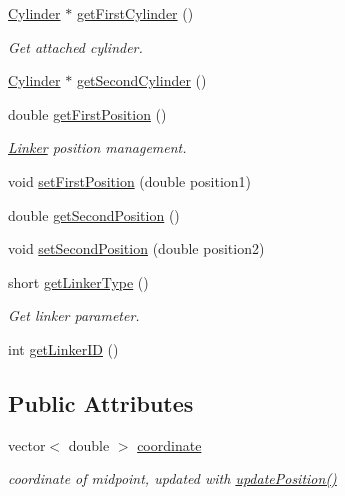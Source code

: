 {\bf }\par
\begin{DoxyCompactItemize}
\item 
\hyperlink{classCylinder}{Cylinder} $\ast$ \hyperlink{classLinker_a5cb37f37606e5f76f105e4f11a55a0a4}{get\+First\+Cylinder} ()
\begin{DoxyCompactList}\small\item\em Get attached cylinder. \end{DoxyCompactList}\item 
\hyperlink{classCylinder}{Cylinder} $\ast$ \hyperlink{classLinker_a7f7e3c20b80a578cd8060770b24cba80}{get\+Second\+Cylinder} ()
\end{DoxyCompactItemize}

{\bf }\par
\begin{DoxyCompactItemize}
\item 
double \hyperlink{classLinker_a8b92727910c0a6d6c171d26a87305109}{get\+First\+Position} ()
\begin{DoxyCompactList}\small\item\em \hyperlink{classLinker}{Linker} position management. \end{DoxyCompactList}\item 
void \hyperlink{classLinker_ae7f0b6b41a3e2a4ee9cba35370c930f8}{set\+First\+Position} (double position1)
\item 
double \hyperlink{classLinker_a38d56541e9e262641a5d5281f1aac174}{get\+Second\+Position} ()
\item 
void \hyperlink{classLinker_a3765490ad3094ce06e574449dc45aae4}{set\+Second\+Position} (double position2)
\end{DoxyCompactItemize}

{\bf }\par
\begin{DoxyCompactItemize}
\item 
short \hyperlink{classLinker_a04dfdd522ce25bffe14e82798fa07c56}{get\+Linker\+Type} ()
\begin{DoxyCompactList}\small\item\em Get linker parameter. \end{DoxyCompactList}\item 
int \hyperlink{classLinker_aaf5fde2540563301384e0404c16b7793}{get\+Linker\+I\+D} ()
\end{DoxyCompactItemize}

\subsection*{Public Attributes}
\begin{DoxyCompactItemize}
\item 
vector$<$ double $>$ \hyperlink{classLinker_a224aa9b2a6f8f565aef4deae0fe299ce}{coordinate}
\begin{DoxyCompactList}\small\item\em coordinate of midpoint, updated with \hyperlink{classLinker_aa268869b1ed75f38973aafd1362a5c42}{update\+Position()} \end{DoxyCompactList}\end{DoxyCompactItemize}
